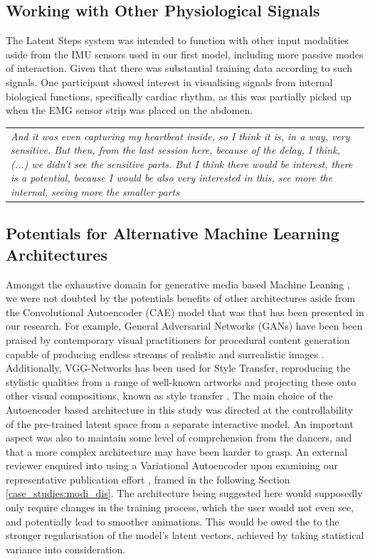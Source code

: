 \subsection*{Working with Other Physiological Signals}

The Latent Steps system was intended to function with other input modalities aside from the IMU sensors used in our first model, including more passive modes of interaction. Given that there was substantial training data according to such signals. One participant showed interest in visualising signals from internal biological functions, specifically cardiac rhythm, as this was partially picked up when the EMG sensor strip was placed on the abdomen.

\begin{center}
\begin{tabular}{ p{13cm}}
\textit{And it was even capturing my heartbeat inside, so I think it is, in a way, very sensitive. But then, from the last session here, because of the delay, I think, (...) we didn't see the sensitive parts. But I think there would be interest, there is a potential, because I would be also very interested in this, see more the internal, seeing more the smaller parts}
\end{tabular}
\end{center}

\subsection*{Potentials for Alternative Machine Learning Architectures}
\label{subsec:alternative_ml}

Amongst the exhaustive domain for generative media based Machine Leaning \cite{hertzmann_aesthetics_2019}, we were not doubted by the potentials benefits of other architectures aside from the Convolutional Autoencoder (CAE) model that was that has been presented in our research. For example, General Adversarial Networks (GANs) have been been praised by contemporary visual practitioners for procedural content generation capable of producing endless streams of realistic and surrealistic images \cite{karras_style-based_2019,Elgammal2017CANCA}. Additionally, VGG-Networks has been used for Style Transfer, reproducing the stylistic qualities from a range of well-known artworks and projecting these onto other visual compositions, known as style transfer \cite{gatys_neural_2015}. The main choice of the Autoencoder based architecture in this study was directed at the controllability of the pre-trained latent space from a separate interactive model. An important aspect was also to maintain some level of comprehension from the dancers, and that a more complex architecture may have been harder to grasp.
An external reviewer enquired into using a Variational Autoencoder upon examining our representative publication effort \cite{correia_designing_2022}, framed in the following Section \ref{case_studies:modi_dis}. The architecture being suggested here would supposedly only require changes in the training process, which the user would not even see, and potentially lead to smoother animations. This would be owed the to the stronger regularisation of the model's latent vectors, achieved by taking statistical variance into consideration.

